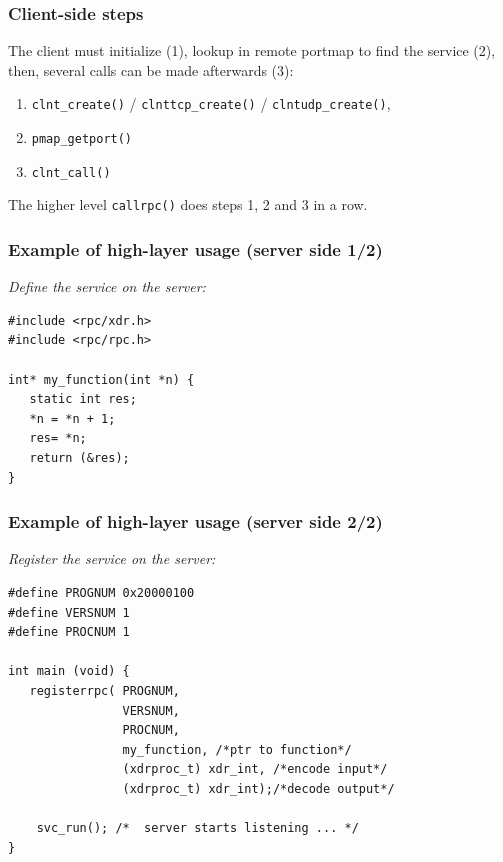 \documentclass[bigger,hyperref={colorlinks=true, urlcolor=red, plainpages=false, pdfpagelabels, bookmarksnumbered}]{beamer}
\begin{document}
\begin{frame}
\frametitle{Client-side steps}
\label{sec-2-9}

   The client must initialize (1), lookup in remote portmap to find the service (2),
   then, several calls can be made afterwards (3):
\begin{enumerate}
\item \texttt{clnt\_create()} / \texttt{clnttcp\_create()} / \texttt{clntudp\_create()},
\item \texttt{pmap\_getport()}
\item \texttt{clnt\_call()}
\end{enumerate}

   The higher level \texttt{callrpc()} does steps 1, 2 and 3 in a row.
\end{frame}
\begin{frame}[fragile]
\frametitle{Example of high-layer usage (server side 1/2)}
\label{sec-2-10}

\emph{Define the service on the server:}

\lstset{language=C}
\begin{lstlisting}
#include <rpc/xdr.h>
#include <rpc/rpc.h>

int* my_function(int *n) {
   static int res;
   *n = *n + 1;
   res= *n; 
   return (&res);
}
\end{lstlisting}
 
\end{frame}
\begin{frame}[fragile]
\frametitle{Example of high-layer usage (server side 2/2)}
\label{sec-2-11}

\emph{Register the service on the server:}

\lstset{language=C}
\begin{lstlisting}
#define PROGNUM 0x20000100                                                      
#define VERSNUM 1                                                               
#define PROCNUM 1

int main (void) {
   registerrpc( PROGNUM,
                VERSNUM,
                PROCNUM,
                my_function, /*ptr to function*/
                (xdrproc_t) xdr_int, /*encode input*/
                (xdrproc_t) xdr_int);/*decode output*/

    svc_run(); /*  server starts listening ... */
}
\end{lstlisting}
\end{frame}
\end{document}
